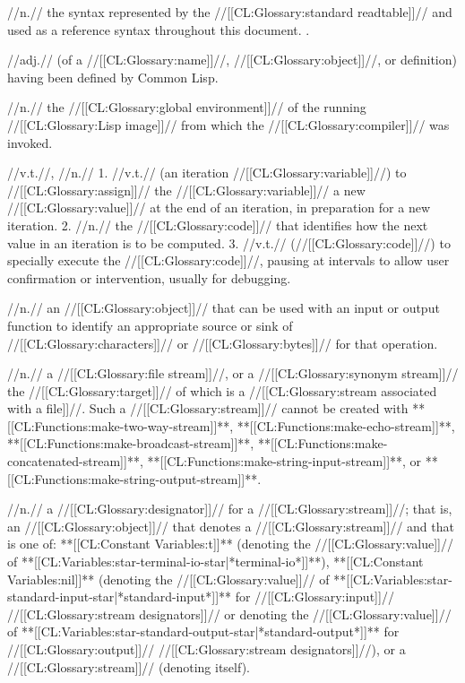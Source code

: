 //n.// the syntax represented by the //[[CL:Glossary:standard readtable]]// and used as a reference syntax throughout this document. \Seesection\TheStandardSyntax.

 //adj.// (of a //[[CL:Glossary:name]]//, //[[CL:Glossary:object]]//, or definition) having been defined by Common Lisp. 

 //n.// the //[[CL:Glossary:global environment]]// of the running //[[CL:Glossary:Lisp image]]// from which the //[[CL:Glossary:compiler]]// was invoked.

 //v.t.//, //n.// 1. //v.t.// (an iteration //[[CL:Glossary:variable]]//) to //[[CL:Glossary:assign]]// the //[[CL:Glossary:variable]]// a new //[[CL:Glossary:value]]// at the end of an iteration, in preparation for a new iteration. 2. //n.// the //[[CL:Glossary:code]]// that identifies how the next value in an iteration is to be computed. 3. //v.t.// (//[[CL:Glossary:code]]//) to specially execute the //[[CL:Glossary:code]]//, pausing at intervals to allow user confirmation or intervention, usually for debugging.

 //n.// an //[[CL:Glossary:object]]// that can be used with an input or output function to identify an appropriate source or sink of //[[CL:Glossary:characters]]// or //[[CL:Glossary:bytes]]// for that operation.

 //n.// a //[[CL:Glossary:file stream]]//, or a //[[CL:Glossary:synonym stream]]// the //[[CL:Glossary:target]]// of which is a //[[CL:Glossary:stream associated with a file]]//. Such a //[[CL:Glossary:stream]]// cannot be created with **[[CL:Functions:make-two-way-stream]]**, **[[CL:Functions:make-echo-stream]]**, **[[CL:Functions:make-broadcast-stream]]**, **[[CL:Functions:make-concatenated-stream]]**, **[[CL:Functions:make-string-input-stream]]**, or **[[CL:Functions:make-string-output-stream]]**.

 //n.// a //[[CL:Glossary:designator]]// for a //[[CL:Glossary:stream]]//; that is, an //[[CL:Glossary:object]]// that denotes a //[[CL:Glossary:stream]]// and that is one of: **[[CL:Constant Variables:t]]** (denoting the //[[CL:Glossary:value]]// of **[[CL:Variables:star-terminal-io-star|*terminal-io*]]**), **[[CL:Constant Variables:nil]]** (denoting the //[[CL:Glossary:value]]// of **[[CL:Variables:star-standard-input-star|*standard-input*]]** for //[[CL:Glossary:input]]// //[[CL:Glossary:stream designators]]// or denoting the //[[CL:Glossary:value]]// of **[[CL:Variables:star-standard-output-star|*standard-output*]]** for //[[CL:Glossary:output]]// //[[CL:Glossary:stream designators]]//), or a //[[CL:Glossary:stream]]// (denoting itself).


